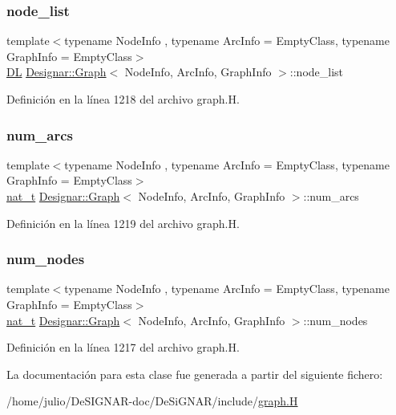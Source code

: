 \subsubsection{\texorpdfstring{node\+\_\+list}{node\_list}}
{\footnotesize\ttfamily template$<$typename Node\+Info , typename Arc\+Info  = Empty\+Class, typename Graph\+Info  = Empty\+Class$>$ \\
\hyperlink{class_designar_1_1_d_l}{DL} \hyperlink{class_designar_1_1_graph}{Designar\+::\+Graph}$<$ Node\+Info, Arc\+Info, Graph\+Info $>$\+::node\+\_\+list\hspace{0.3cm}{\ttfamily [protected]}}



Definición en la línea 1218 del archivo graph.\+H.

\mbox{\label{class_designar_1_1_graph_a035a0debf7a7545d0033f37cf941020f}} 
\subsubsection{\texorpdfstring{num\+\_\+arcs}{num\_arcs}}
{\footnotesize\ttfamily template$<$typename Node\+Info , typename Arc\+Info  = Empty\+Class, typename Graph\+Info  = Empty\+Class$>$ \\
\hyperlink{namespace_designar_aa72662848b9f4815e7bf31a7cf3e33d1}{nat\+\_\+t} \hyperlink{class_designar_1_1_graph}{Designar\+::\+Graph}$<$ Node\+Info, Arc\+Info, Graph\+Info $>$\+::num\+\_\+arcs\hspace{0.3cm}{\ttfamily [protected]}}



Definición en la línea 1219 del archivo graph.\+H.

\mbox{\label{class_designar_1_1_graph_a1ff2ba87ab27911b1f6d47e622e67542}} 
\subsubsection{\texorpdfstring{num\+\_\+nodes}{num\_nodes}}
{\footnotesize\ttfamily template$<$typename Node\+Info , typename Arc\+Info  = Empty\+Class, typename Graph\+Info  = Empty\+Class$>$ \\
\hyperlink{namespace_designar_aa72662848b9f4815e7bf31a7cf3e33d1}{nat\+\_\+t} \hyperlink{class_designar_1_1_graph}{Designar\+::\+Graph}$<$ Node\+Info, Arc\+Info, Graph\+Info $>$\+::num\+\_\+nodes\hspace{0.3cm}{\ttfamily [protected]}}



Definición en la línea 1217 del archivo graph.\+H.



La documentación para esta clase fue generada a partir del siguiente fichero\+:\begin{DoxyCompactItemize}
\item 
/home/julio/\+De\+S\+I\+G\+N\+A\+R-\/doc/\+De\+Si\+G\+N\+A\+R/include/\hyperlink{graph_8_h}{graph.\+H}\end{DoxyCompactItemize}

